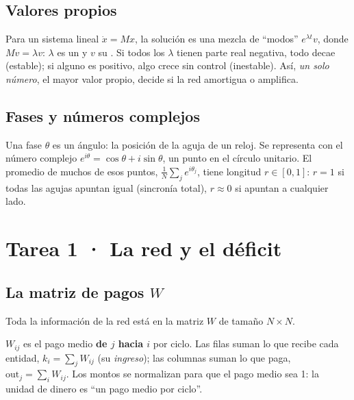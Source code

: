 \section{Valores propios}
Para un sistema lineal $\dot x = Mx$, la solución es una mezcla de ``modos''
$e^{\lambda t}v$, donde $Mv=\lambda v$: $\lambda$ es un  y $v$ su
. Si todos los $\lambda$ tienen parte real negativa, todo decae
(estable); si alguno es positivo, algo crece sin control (inestable). Así, \emph{un
solo número}, el mayor valor propio, decide si la red amortigua o amplifica.

\section{Fases y números complejos}
Una fase $\theta$ es un ángulo: la posición de la aguja de un reloj. Se representa con
el número complejo $e^{i\theta}=\cos\theta + i\sin\theta$, un punto en el círculo
unitario. El promedio de muchos de esos puntos, $\frac1N\sum_j e^{i\theta_j}$, tiene
longitud $r\in[0,1]$: $r=1$ si todas las agujas apuntan igual (sincronía total),
$r\approx0$ si apuntan a cualquier lado.

\chapter{Tarea 1 · La red y el déficit}

\section{La matriz de pagos $W$}
Toda la información de la red está en la matriz $W$ de tamaño $N\times N$.
\begin{nota}
$W_{ij}$ es el pago medio \textbf{de $j$ hacia $i$} por ciclo. Las filas suman lo que
recibe cada entidad, $k_i = \sum_j W_{ij}$ (su \emph{ingreso}); las columnas suman lo
que paga, $\mathrm{out}_j=\sum_i W_{ij}$. Los montos se normalizan para que el pago
medio sea 1: la unidad de dinero es ``un pago medio por ciclo''.
\end{nota}

